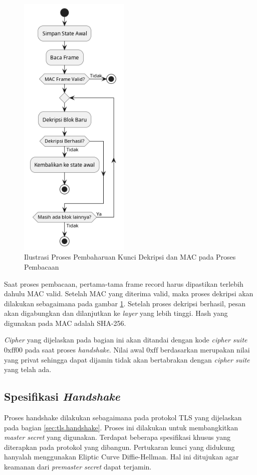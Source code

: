 \begin{figure}[!h]
  \centering
  \includegraphics[width=200px]{chapters/res/chapter-3/img/update.read.png}
  \caption{Ilustrasi Proses Pembaharuan Kunci Dekripsi dan MAC pada Proses Pembacaan} \label{fig:tls.cipher.update.mac.read}
\end{figure}

Saat proses pembacaan, pertama-tama frame record harus dipastikan terlebih dahulu MAC valid. Setelah MAC yang diterima valid, maka proses dekripsi akan dilakukan sebagaimana pada gambar \ref{fig:tls.cipher.update.mac.read}. Setelah proses dekripsi berhasil, pesan akan digabungkan dan dilanjutkan ke \emph{layer} yang lebih tinggi. Hash yang digunakan pada MAC adalah SHA-256.

\emph{Cipher} yang dijelaskan pada bagian ini akan ditandai dengan kode \emph{cipher suite} $\text{0xff00}$ pada saat proses \emph{handshake}. Nilai awal $\text{0xff}$ berdasarkan \textcite{rfc5246} merupakan nilai yang privat sehingga dapat dijamin tidak akan bertabrakan dengan \emph{cipher suite} yang telah ada.

\subsection{Spesifikasi \emph{Handshake}}
Proses handshake dilakukan sebagaimana pada protokol TLS yang dijelaskan pada bagian \ref{sec:tls.handshake}. Proses ini dilakukan untuk membangkitkan \emph{master secret} yang digunakan. Terdapat beberapa spesifikasi khusus yang diterapkan pada protokol yang dibangun. Pertukaran kunci yang didukung hanyalah menggunakan Eliptic Curve Diffie-Hellman. Hal ini ditujukan agar keamanan dari \emph{premaster secret} dapat terjamin.

